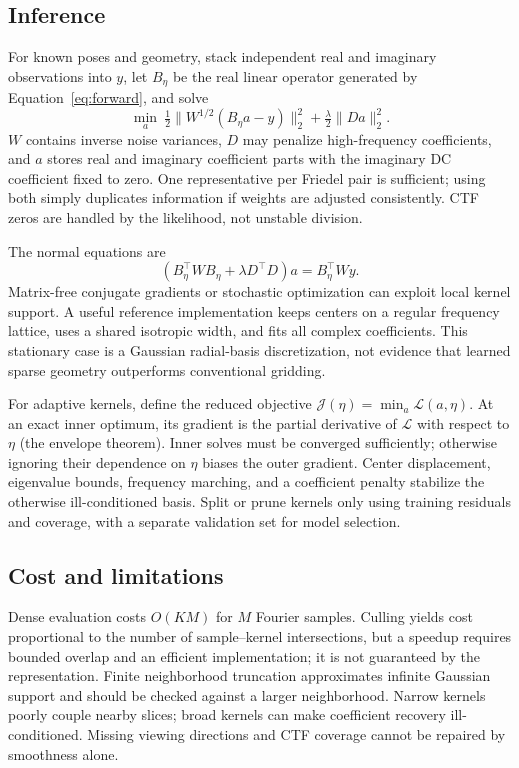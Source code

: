 \documentclass{article}
\begin{document}
\subsection{Inference}
For known poses and geometry, stack independent real and imaginary observations into $y$, let $B_\eta$ be the real linear operator generated by Equation~\eqref{eq:forward}, and solve
\begin{equation}\label{eq:objective}
\min_a\ \tfrac12\|W^{1/2}(B_\eta a-y)\|_2^2+\tfrac\lambda2\|Da\|_2^2.
\end{equation}
$W$ contains inverse noise variances, $D$ may penalize high-frequency coefficients, and $a$ stores real and imaginary coefficient parts with the imaginary DC coefficient fixed to zero. One representative per Friedel pair is sufficient; using both simply duplicates information if weights are adjusted consistently. CTF zeros are handled by the likelihood, not unstable division.

The normal equations are
\begin{equation}
(B_\eta^\top WB_\eta+\lambda D^\top D)a=B_\eta^\top Wy.
\end{equation}
Matrix-free conjugate gradients or stochastic optimization can exploit local kernel support. A useful reference implementation keeps centers on a regular frequency lattice, uses a shared isotropic width, and fits all complex coefficients. This stationary case is a Gaussian radial-basis discretization, not evidence that learned sparse geometry outperforms conventional gridding.

For adaptive kernels, define the reduced objective $\mathcal J(\eta)=\min_a\mathcal L(a,\eta)$. At an exact inner optimum, its gradient is the partial derivative of $\mathcal L$ with respect to $\eta$ (the envelope theorem). Inner solves must be converged sufficiently; otherwise ignoring their dependence on $\eta$ biases the outer gradient. Center displacement, eigenvalue bounds, frequency marching, and a coefficient penalty stabilize the otherwise ill-conditioned basis. Split or prune kernels only using training residuals and coverage, with a separate validation set for model selection.

\subsection{Cost and limitations}
Dense evaluation costs $O(KM)$ for $M$ Fourier samples. Culling yields cost proportional to the number of sample--kernel intersections, but a speedup requires bounded overlap and an efficient implementation; it is not guaranteed by the representation. Finite neighborhood truncation approximates infinite Gaussian support and should be checked against a larger neighborhood. Narrow kernels poorly couple nearby slices; broad kernels can make coefficient recovery ill-conditioned. Missing viewing directions and CTF coverage cannot be repaired by smoothness alone.
\end{document}
